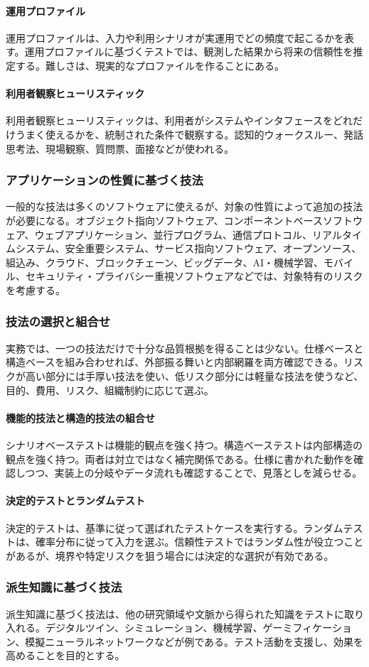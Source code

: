 \paragraph{運用プロファイル}
運用プロファイルは、入力や利用シナリオが実運用でどの頻度で起こるかを表す。運用プロファイルに基づくテストでは、観測した結果から将来の信頼性を推定する。難しさは、現実的なプロファイルを作ることにある。

\paragraph{利用者観察ヒューリスティック}
利用者観察ヒューリスティックは、利用者がシステムやインタフェースをどれだけうまく使えるかを、統制された条件で観察する。認知的ウォークスルー、発話思考法、現場観察、質問票、面接などが使われる。

\subsubsection{アプリケーションの性質に基づく技法}
一般的な技法は多くのソフトウェアに使えるが、対象の性質によって追加の技法が必要になる。オブジェクト指向ソフトウェア、コンポーネントベースソフトウェア、ウェブアプリケーション、並行プログラム、通信プロトコル、リアルタイムシステム、安全重要システム、サービス指向ソフトウェア、オープンソース、組込み、クラウド、ブロックチェーン、ビッグデータ、AI・機械学習、モバイル、セキュリティ・プライバシー重視ソフトウェアなどでは、対象特有のリスクを考慮する。

\subsubsection{技法の選択と組合せ}
実務では、一つの技法だけで十分な品質根拠を得ることは少ない。仕様ベースと構造ベースを組み合わせれば、外部振る舞いと内部網羅を両方確認できる。リスクが高い部分には手厚い技法を使い、低リスク部分には軽量な技法を使うなど、目的、費用、リスク、組織制約に応じて選ぶ。

\paragraph{機能的技法と構造的技法の組合せ}
シナリオベーステストは機能的観点を強く持つ。構造ベーステストは内部構造の観点を強く持つ。両者は対立ではなく補完関係である。仕様に書かれた動作を確認しつつ、実装上の分岐やデータ流れも確認することで、見落としを減らせる。

\paragraph{決定的テストとランダムテスト}
決定的テストは、基準に従って選ばれたテストケースを実行する。ランダムテストは、確率分布に従って入力を選ぶ。信頼性テストではランダム性が役立つことがあるが、境界や特定リスクを狙う場合には決定的な選択が有効である。

\subsubsection{派生知識に基づく技法}
派生知識に基づく技法は、他の研究領域や文脈から得られた知識をテストに取り入れる。デジタルツイン、シミュレーション、機械学習、ゲーミフィケーション、模擬ニューラルネットワークなどが例である。テスト活動を支援し、効果を高めることを目的とする。
